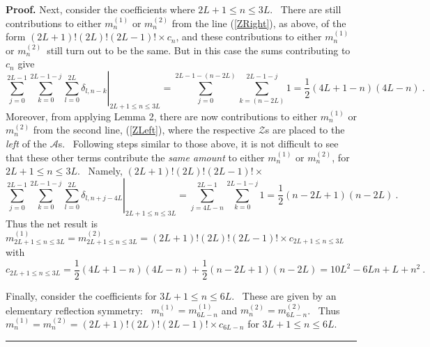 \documentclass[aps,preprint,tightenlines,unsortedaddress,11pt]{revtex4}\usepackage{amsfonts}
\newenvironment{proof}[1][Proof]{\noindent\textbf{#1.} }{\ \rule{0.5em}{0.5em}}
\begin{document}
\begin{proof}
Next, consider the coefficients where $2L+1\leq n\leq3L$. \ There are still
contributions to either $m_{n}^{\left(  1\right)  }$ or $m_{n}^{\left(
2\right)  }$ from the line (\ref{ZRight}), as above, of the form $\left(
2L+1\right)  !\left(  2L\right)  !\left(  2L-1\right)  !\times c_{n}$, and
these contributions to either $m_{n}^{\left(  1\right)  }$ or $m_{n}^{\left(
2\right)  }$\ still turn out to be the same. But in this case the sums
contributing to $c_{n}$ give\begin{equation}
\left.  \sum_{j=0}^{2L-1}\sum_{k=0}^{2L-1-j}\sum_{l=0}^{2L}\delta
_{l,n-k}\right\vert _{2L+1\leq n\leq3L}=\sum_{j=0}^{2L-1-\left(  n-2L\right)
}\sum_{k=\left(  n-2L\right)  }^{2L-1-j}1=\frac{1}{2}\left(  4L+1-n\right)
\left(  4L-n\right)  \ .
\end{equation}
Moreover, from applying Lemma 2, there are now contributions to either
$m_{n}^{\left(  1\right)  }$ or $m_{n}^{\left(  2\right)  }$ from the second
line, (\ref{ZLeft}), where the respective $\mathcal{Z}$s are placed to the
\emph{left} of the $\mathcal{A}$s. \ Following steps similar to those above,
it is not difficult to see that these other terms contribute the \emph{same
amount} to either $m_{n}^{\left(  1\right)  }$ or $m_{n}^{\left(  2\right)  }$, for $2L+1\leq n\leq3L$. \ Namely, $\left(  2L+1\right)  !\left(  2L\right)
!\left(  2L-1\right)  !\times$\begin{equation}
\left.  \sum_{j=0}^{2L-1}\sum_{k=0}^{2L-1-j}\sum_{l=0}^{2L}\delta
_{l,n+j-4L}\right\vert _{2L+1\leq n\leq3L}=\sum_{j=4L-n}^{2L-1}\sum
_{k=0}^{2L-1-j}1=\frac{1}{2}\left(  n-2L+1\right)  \left(  n-2L\right)  \ .
\end{equation}
Thus the net result is $m_{2L+1\leq n\leq3L}^{\left(  1\right)  }=m_{2L+1\leq
n\leq3L}^{\left(  2\right)  }=\left(  2L+1\right)  !\left(  2L\right)
!\left(  2L-1\right)  !\times c_{2L+1\leq n\leq3L}$ with\begin{equation}
c_{2L+1\leq n\leq3L}=\frac{1}{2}\left(  4L+1-n\right)  \left(  4L-n\right)
+\frac{1}{2}\left(  n-2L+1\right)  \left(  n-2L\right)  =10L^{2}-6Ln+L+n^{2}\ .
\end{equation}


Finally, consider the coefficients for $3L+1\leq n\leq6L$. \ These are given
by an elementary reflection symmetry: \ $m_{n}^{\left(  1\right)  }=m_{6L-n}^{\left(  1\right)  }$ and $m_{n}^{\left(  2\right)  }=m_{6L-n}^{\left(  2\right)  }$. \ Thus $m_{n}^{\left(  1\right)  }=m_{n}^{\left(
2\right)  }=\left(  2L+1\right)  !\left(  2L\right)  !\left(  2L-1\right)
!\times c_{6L-n}$ for $3L+1\leq n\leq6L$.
\end{proof}
\end{document}
